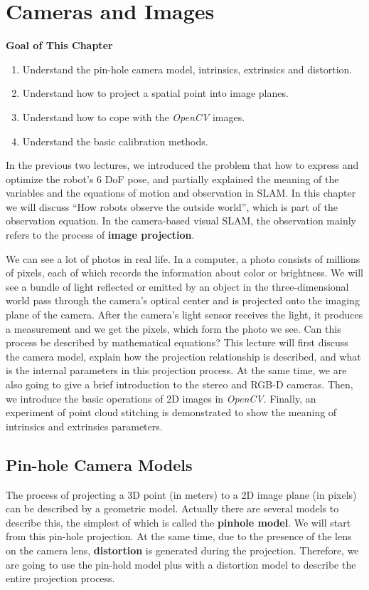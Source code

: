 \chapter{Cameras and Images}
\label{cpt:5}
\begin{mdframed}  
	\textbf{Goal of This Chapter}
	\begin{enumerate}[labelindent=0em,leftmargin=1.5em]
		\item Understand the pin-hole camera model, intrinsics, extrinsics and distortion. 
		\item Understand how to project a spatial point into image planes. 
		\item Understand how to cope with the \textit{OpenCV} images.
		\item Understand the basic calibration methods. 
	\end{enumerate}
\end{mdframed} 

In the previous two lectures, we introduced the problem that how to express and optimize the robot's 6 DoF pose, and partially explained the meaning of the variables and the equations of motion and observation in SLAM. In this chapter we will discuss ``How robots observe the outside world'', which is part of the observation equation. In the camera-based visual SLAM, the observation mainly refers to the process of \textbf{image projection}.

We can see a lot of photos in real life. In a computer, a photo consists of millions of pixels, each of which records the information about color or brightness. We will see a bundle of light reflected or emitted by an object in the three-dimensional world pass through the camera's optical center and is projected onto the imaging plane of the camera. After the camera's light sensor receives the light, it produces a measurement and we get the pixels, which form the photo we see. Can this process be described by mathematical equations? This lecture will first discuss the camera model, explain how the projection relationship is described, and what is the internal parameters in this projection process. At the same time, we are also going to give a brief introduction to the stereo and RGB-D cameras. Then, we introduce the basic operations of 2D images in \textit{OpenCV}. Finally, an experiment of point cloud stitching is demonstrated to show the meaning of intrinsics and extrinsics parameters.

\newpage
\section{Pin-hole Camera Models}
The process of projecting a 3D point (in meters) to a 2D image plane (in pixels) can be described by a geometric model. Actually there are several models to describe this, the simplest of which is called the \textbf{pinhole model}. We will start from this pin-hole projection. At the same time, due to the presence of the lens on the camera lens, \textbf{distortion} is generated during the projection. Therefore, we are going to use the pin-hold model plus with a distortion model to describe the entire projection process.

